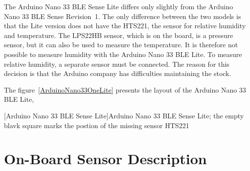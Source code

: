 \bigskip



\bigskip

The Arduino Nano 33 BLE Sense Lite differs only slightly from the Arduino Nano 33 BLE Sense Revision~1. The only difference between the two models is that the Lite version does not have the HTS221, the sensor for relative humidity and temperature. The LPS22HB sensor, which is on the board, is a pressure sensor, but it can also be used to measure the temperature. It is therefore not possible to measure humidity with the Arduino Nano 33 BLE Lite. To measure relative humidity, a separate sensor must be connected. The reason for this decision is that the Arduino company has difficulties maintaining the stock. \cite{Filipi:2022}




The figure~\ref{ArduinoNano33OneLite} presents the  layout of the Arduino Nano 33 BLE Lite,

\begin{center}
	
	
	
	
	
	
	
	
	[Arduino Nano 33 BLE Sense Lite]{Arduino Nano 33 BLE Sense Lite; the empty blavk square marks the postion of the missing sensor HTS221}

\label{ArduinoNano33OneLite}
\end{center}


\section{On-Board Sensor Description}

